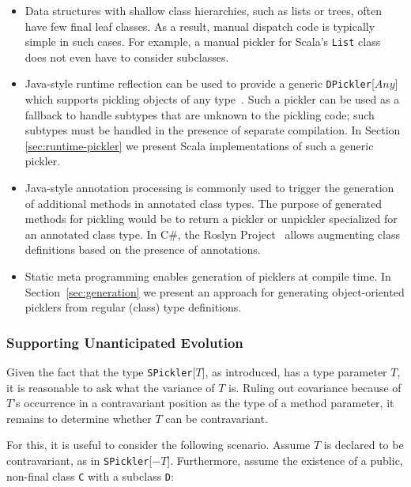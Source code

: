\documentclass[preprint,10pt]{sigplanconf}
\theoremstyle{definition}
\theoremstyle{definition}
\newcommand{\term}[1]{\mbox{\texttt{#1}}}
\begin{document}
\begin{itemize}
\item Data structures with shallow class hierarchies, such as lists or trees,
often have few final leaf classes. As a result, manual dispatch code is
typically simple in such cases. For example, a manual pickler for Scala's
\term{List} class does not even have to consider subclasses.

\item Java-style runtime reflection can be used to provide a generic
\term{DPickler}[$Any$] which supports pickling objects of any
type~\cite{JavaSerialization,Philippsen2000}. Such a pickler can be used as a
fallback to handle subtypes that are unknown to the pickling code; such
subtypes must be handled in the presence of separate compilation. In
Section \ref{sec:runtime-pickler} we present Scala implementations of such a
generic pickler.

\item Java-style annotation processing is commonly used to trigger the
generation of additional methods in annotated class types. The purpose of
generated methods for pickling would be to return a pickler or unpickler
specialized for an annotated class type. In C\#, the Roslyn
Project~\cite{Roslyn} allows augmenting class definitions based on the
presence of annotations.

\item Static meta programming \cite{Burmako2012,Nemerle} enables generation of
picklers at compile time. In Section~\ref{sec:generation} we present an
approach for generating object-oriented picklers from regular (class) type
definitions.
\end{itemize}

\subsubsection{Supporting Unanticipated Evolution}

Given the fact that the type \term{SPickler}[$T$], as introduced, has a type
parameter $T$, it is reasonable to ask what the variance of $T$ is. Ruling out
covariance because of $T$'s occurrence in a contravariant position as the type
of a method parameter, it remains to determine whether $T$ can be
contravariant.

For this, it is useful to consider the following scenario. Assume $T$ is
declared to be contravariant, as in \term{SPickler}[$-T$]. Furthermore, assume
the existence of a public, non-final class \term{C} with a subclass \term{D}:
\end{document}
